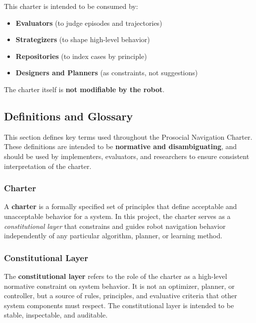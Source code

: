\documentclass[utf8]{frontiers_suppmat} %
\providecommand{\tightlist}{%
  \setlength{\itemsep}{0pt}\setlength{\parskip}{0pt}}
\begin{document}
This charter is intended to be consumed by:

\begin{itemize}
\tightlist
\item
  \textbf{Evaluators} (to judge episodes and trajectories)
\item
  \textbf{Strategizers} (to shape high-level behavior)
\item
  \textbf{Repositories} (to index cases by principle)
\item
  \textbf{Designers and Planners} (as constraints, not suggestions)
\end{itemize}

The charter itself is \textbf{not modifiable by the robot}.

\subsection{Definitions and Glossary}\label{definitions-and-glossary}

This section defines key terms used throughout the Prosocial Navigation
Charter. These definitions are intended to be \textbf{normative and
disambiguating}, and should be used by implementers, evaluators, and
researchers to ensure consistent interpretation of the charter.

\subsubsection{Charter}\label{charter}

A \textbf{charter} is a formally specified set of principles that define
acceptable and unacceptable behavior for a system. In this project, the
charter serves as a \emph{constitutional layer} that constrains and
guides robot navigation behavior independently of any particular
algorithm, planner, or learning method.

\subsubsection{Constitutional Layer}\label{constitutional-layer}

The \textbf{constitutional layer} refers to the role of the charter as a
high-level normative constraint on system behavior. It is not an
optimizer, planner, or controller, but a source of rules, principles,
and evaluative criteria that other system components must respect. The
constitutional layer is intended to be stable, inspectable, and
auditable.
\end{document}
